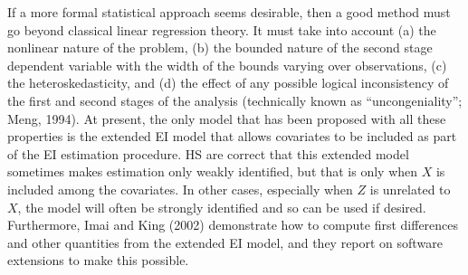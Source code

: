 \documentclass[11pt,titlepage]{article}
\begin{document}
If a more formal statistical approach seems desirable, then a good
method must go beyond classical linear regression theory.  It must
take into account (a) the nonlinear nature of the problem, (b) the
bounded nature of the second stage dependent variable with the width
of the bounds varying over observations, (c) the heteroskedasticity,
and (d) the effect of any possible logical inconsistency of the first
and second stages of the analysis (technically known as
``uncongeniality''; Meng, 1994).  At present, the only model that has
been proposed with all these properties is the extended EI model that
allows covariates to be included as part of the EI estimation
procedure.  HS are correct that this extended model sometimes makes
estimation only weakly identified, but that is only when $X$ is
included among the covariates.  In other cases, especially when $Z$ is
unrelated to $X$, the model will often be strongly identified and so
can be used if desired.  Furthermore, Imai and King (2002) demonstrate
how to compute first differences and other quantities from the
extended EI model, and they report on software extensions to make this
possible.
\end{document}
